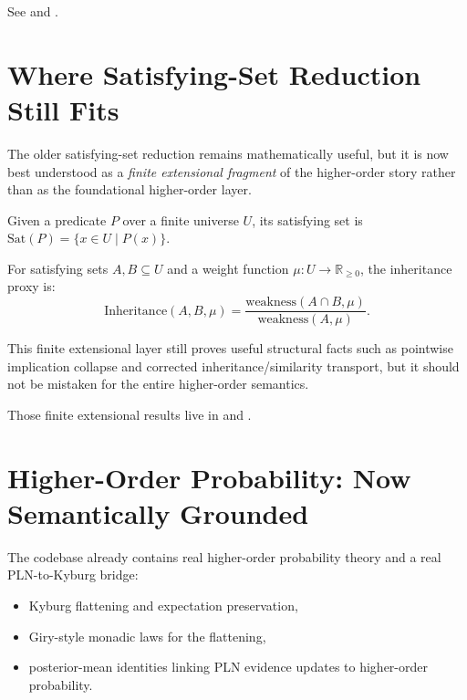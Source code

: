 \documentclass[11pt,openany]{report}
\begin{document}
See
 and
.

\section{Where Satisfying-Set Reduction Still Fits}

The older satisfying-set reduction remains mathematically useful, but it is
now best understood as a \emph{finite extensional fragment} of the higher-order
story rather than as the foundational higher-order layer.

\begin{definition}
Given a predicate $P$ over a finite universe $U$, its satisfying set is
$\mathrm{Sat}(P) = \{x \in U \mid P(x)\}$.
\end{definition}

\begin{definition}
For satisfying sets $A, B \subseteq U$ and a weight function
$\mu : U \to \mathbb{R}_{\ge 0}$, the inheritance proxy is:
\[
  \mathrm{Inheritance}(A, B, \mu) =
  \frac{\mathrm{weakness}(A \cap B, \mu)}{\mathrm{weakness}(A, \mu)}.
\]
\end{definition}

This finite extensional layer still proves useful structural facts such as
pointwise implication collapse and corrected inheritance/similarity transport,
but it should not be mistaken for the entire higher-order semantics.

Those finite extensional results live in
 and
.

\section{Higher-Order Probability: Now Semantically Grounded}

The codebase already contains real higher-order probability theory and a real
PLN-to-Kyburg bridge:
\begin{itemize}
\item Kyburg flattening and expectation preservation,
\item Giry-style monadic laws for the flattening,
\item posterior-mean identities linking PLN evidence updates to higher-order
  probability.
\end{itemize}
\end{document}
